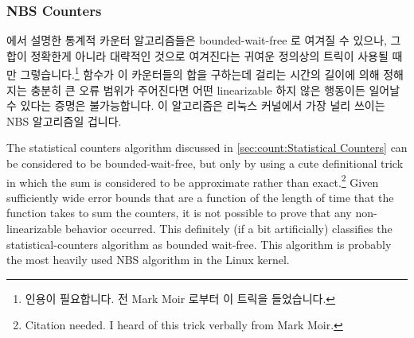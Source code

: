 \iffalse

Another simple NBS algorithm implements a set of integers in an array.
Here the array index indicates a value that might be a member of the set
and the array element indicates whether or not that value actually is
a set member.
The linearizability criterion for NBS algorithms requires that reads from
and updates to the array either use atomic instructions or be accompanied
by memory barriers, but in the not-uncommon case where linearizability
is not important, simple volatile loads and stores suffice, for example,
using \co{READ_ONCE()} and \co{WRITE_ONCE()}.

An NBS set may also be implemented using a bitmap, where each value that
might be a member of the set corresponds to one bit.
Reads and updates must normally be carried out via atomic bit-manipulation
instructions, although compare-and-swap (\co{cmpxchg()} or CAS)
instructions can also be used.

\fi

\subsubsection{NBS Counters}
\label{sec:advsync:NBS Counters}

 에서 설명한 통계적 카운터 알고리즘들은
bounded-wait-free 로 여겨질 수 있으나, 그 합이 정확한게 아니라 대략적인 것으로
여겨진다는 귀여운 정의상의 트릭이 사용될 때만 그렇습니다.\footnote{
	인용이 필요합니다.
	전 Mark Moir 로부터 이 트릭을 들었습니다.}
 함수가 이 카운터들의 합을 구하는데 걸리는 시간의 길이에 의해
정해지는 충분히 큰 오류 범위가 주어진다면 어떤 linearizable 하지 않은 행동이든
일어날 수 있다는 증명은 불가능합니다.
이 알고리즘은 리눅스 커널에서 가장 널리 쓰이는 NBS 알고리즘일 겁니다.

\iffalse

The statistical counters algorithm discussed in
\cref{sec:count:Statistical Counters}
can be considered to be bounded-wait-free, but only by using a cute
definitional trick in which the sum is considered to be approximate
rather than exact.\footnote{
	Citation needed.
	I heard of this trick verbally from Mark Moir.}
Given sufficiently wide error bounds that are a function of the length
of time that the  function takes to sum the counters,
it is not possible to prove that any non-linearizable behavior occurred.
This definitely (if a bit artificially) classifies the statistical-counters
algorithm as bounded wait-free.
This algorithm is probably the most heavily used NBS algorithm in the
Linux kernel.

